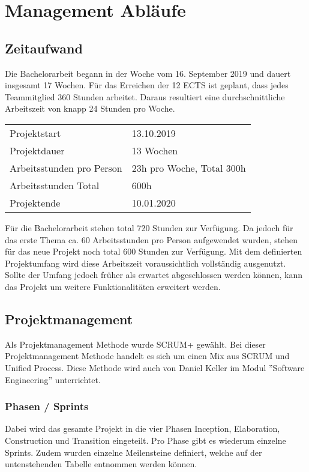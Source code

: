 \section{Management Abläufe}

\subsection{Zeitaufwand}
Die Bachelorarbeit begann in der Woche vom  16. September 2019 und dauert insgesamt 17 Wochen. Für das Erreichen der 12 ECTS ist geplant, dass jedes Teammitglied 360 Stunden arbeitet. Daraus resultiert eine durchschnittliche Arbeitszeit von knapp 24 Stunden pro Woche.

\begin{center}
	\begin{tabularx}{\textwidth}{p{} p{}}
	\toprule
	Projektstart & 13.10.2019 \\
	Projektdauer & 13 Wochen \\
	Arbeitsstunden pro Person & 23h pro Woche, Total 300h \\
	Arbeitsstunden Total & 600h \\
	Projektende & 10.01.2020 \\ \bottomrule
	\end{tabularx}
\end{center}

\noindent Für die Bachelorarbeit stehen total 720 Stunden zur Verfügung. Da jedoch für das erste Thema ca. 60 Arbeitsstunden pro Person aufgewendet wurden, stehen für das neue Projekt noch total 600 Stunden zur Verfügung. Mit dem definierten Projektumfang wird diese Arbeitszeit voraussichtlich vollständig ausgenutzt. Sollte der Umfang jedoch früher als erwartet abgeschlossen werden können, kann das Projekt um weitere Funktionalitäten erweitert werden.

\subsection{Projektmanagement}
Als Projektmanagement Methode wurde SCRUM+ gewählt. Bei dieser Projektmanagement Methode handelt es sich um einen Mix aus SCRUM und Unified Process. Diese Methode wird auch von Daniel Keller im Modul ''Software Engineering'' unterrichtet.

\newpage

\subsubsection{Phasen / Sprints}
Dabei wird das gesamte Projekt in die vier Phasen Inception, Elaboration, Construction und Transition eingeteilt. Pro Phase gibt es wiederum einzelne Sprints. Zudem wurden einzelne Meilensteine definiert, welche auf der untenstehenden Tabelle entnommen werden können.

